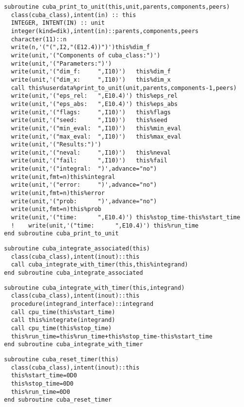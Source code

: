 \begin{Verbatim}
  subroutine cuba_print_to_unit(this,unit,parents,components,peers)
    class(cuba_class),intent(in) :: this
    INTEGER, INTENT(IN) :: unit
    integer(kind=dik),intent(in)::parents,components,peers
    character(11)::n
    write(n,'("(",I2,"(E12.4))")')this%dim_f
    write(unit,'("Components of cuba_class:")')
    write(unit,'("Parameters:")')
    write(unit,'("dim_f:     ",I10)')   this%dim_f
    write(unit,'("dim_x:     ",I10)')   this%dim_x
    call this%userdata%print_to_unit(unit,parents,components-1,peers)
    write(unit,'("eps_rel:   ",E10.4)') this%eps_rel
    write(unit,'("eps_abs:   ",E10.4)') this%eps_abs
    write(unit,'("flags:     ",I10)')   this%flags
    write(unit,'("seed:      ",I10)')   this%seed
    write(unit,'("min_eval:  ",I10)')   this%min_eval
    write(unit,'("max_eval:  ",I10)')   this%max_eval  
    write(unit,'("Results:")')
    write(unit,'("neval:     ",I10)')   this%neval
    write(unit,'("fail:      ",I10)')   this%fail
    write(unit,'("integral:  ")',advance="no")
    write(unit,fmt=n)this%integral
    write(unit,'("error:     ")',advance="no")
    write(unit,fmt=n)this%error
    write(unit,'("prob:      ")',advance="no")
    write(unit,fmt=n)this%prob
    write(unit,'("time:      ",E10.4)') this%stop_time-this%start_time
    !    write(unit,'("time:      ",E10.4)') this%run_time
  end subroutine cuba_print_to_unit
\end{Verbatim}
\begin{Verbatim}
  subroutine cuba_integrate_associated(this)
    class(cuba_class),intent(inout)::this
    call cuba_integrate_with_timer(this,this%integrand)
  end subroutine cuba_integrate_associated
\end{Verbatim}

\begin{Verbatim}
  subroutine cuba_integrate_with_timer(this,integrand)
    class(cuba_class),intent(inout)::this
    procedure(integrand_interface)::integrand
    call cpu_time(this%start_time)
    call this%integrate(integrand)
    call cpu_time(this%stop_time)
    this%run_time=this%run_time+this%stop_time-this%start_time
  end subroutine cuba_integrate_with_timer
\end{Verbatim}

\begin{Verbatim}
  subroutine cuba_reset_timer(this)
    class(cuba_class),intent(inout)::this
    this%start_time=0D0
    this%stop_time=0D0
    this%run_time=0D0
  end subroutine cuba_reset_timer
\end{Verbatim}

